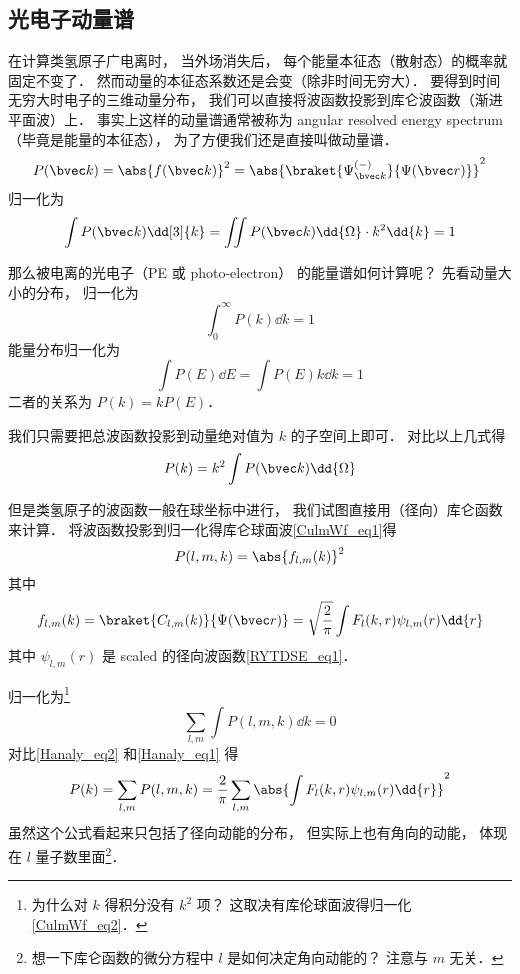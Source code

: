 

\subsection{光电子动量谱}

在计算类氢原子广电离时， 当外场消失后， 每个能量本征态（散射态）的概率就固定不变了． 然而动量的本征态系数还是会变（除非时间无穷大）． 要得到时间无穷大时电子的三维动量分布， 我们可以直接将波函数投影到库仑波函数（渐进平面波）上． 事实上这样的动量谱通常被称为 angular resolved energy spectrum （毕竟是能量的本征态）， 为了方便我们还是直接叫做动量谱．
\begin{equation}
P(\bvec k) = \abs{f(\bvec k)}^2 = \abs{\braket{\Psi^{(-)}_{\bvec k}}{\Psi(\bvec r)}}^2
\end{equation}
归一化为
\begin{equation}
\int P(\bvec k) \dd[3]{k} = \iint P(\bvec k) \dd{\Omega} \cdot k^2\dd{k} = 1
\end{equation}

那么被电离的光电子（PE 或 photo-electron） 的能量谱如何计算呢？ 先看动量大小的分布， 归一化为
\begin{equation}\label{Hanaly_eq2}
\int_0^\infty P(k) \dd{k} = 1
\end{equation}
能量分布归一化为
\begin{equation}\label{Hanaly_eq1}
\int P(E) \dd{E} = \int P(E) k\dd{k} = 1
\end{equation}
二者的关系为 $P(k) = kP(E)$．

我们只需要把总波函数投影到动量绝对值为 $k$ 的子空间上即可． 对比以上几式得
\begin{equation}
P(k) = k^2 \int P(\bvec k) \dd{\Omega}
\end{equation}

但是类氢原子的波函数一般在球坐标中进行， 我们试图直接用（径向）库仑函数来计算． 将波函数投影到归一化得库仑球面波\autoref{CulmWf_eq1}得
\begin{equation}
P(l, m, k) = \abs{f_{l,m}(k)}^2 
\end{equation}
其中
\begin{equation}
f_{l,m}(k) = \braket{C_{l,m}(k)}{\Psi(\bvec r)} = \sqrt{\frac{2}{\pi}} \int F_l(k, r) \psi_{l,m}(r) \dd{r}
\end{equation}
其中 $\psi_{l,m}(r)$ 是 scaled 的径向波函数\autoref{RYTDSE_eq1}．

归一化为\footnote{为什么对 $k$ 得积分没有 $k^2$ 项？ 这取决有库伦球面波得归一化\autoref{CulmWf_eq2}．}
\begin{equation}
\sum_{l,m} \int P(l, m, k) \dd{k} = 0
\end{equation}
对比\autoref{Hanaly_eq2} 和\autoref{Hanaly_eq1} 得
\begin{equation}
P(k) = \sum_{l,m} P(l, m, k) = \frac{2}{\pi} \sum_{l,m} \abs{\int F_l(k, r) \psi_{l,m}(r) \dd{r}}^2
\end{equation}
虽然这个公式看起来只包括了径向动能的分布， 但实际上也有角向的动能， 体现在 $l$ 量子数里面\footnote{想一下库仑函数的微分方程中 $l$ 是如何决定角向动能的？ 注意与 $m$ 无关．}．
